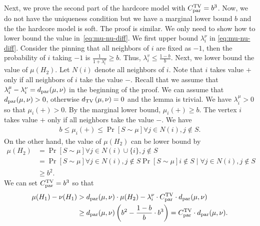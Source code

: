 Next, we prove the second part of the hardcore model with $C^\text{TV}_{\mathrm{par}} = b^3$. Now, we do not have the uniqueness condition but we have a marginal lower bound $b$ and the the hardcore model is soft.
The proof is similar.
We only need to show how to lower bound the value in~\eqref{eq:mu-nu-diff}.
We first upper bound $\lambda^\nu_i$ in \eqref{eq:mu-nu-diff}. Consider the pinning that all neighbors of $i$ are fixed as $-1$, then the probability of $i$ taking $-1$ is $\frac{1}{1+\lambda^\nu_i} \geq b$. Thus, $\lambda_i^v \leq \frac{1-b}{b}$. Next, we lower bound the value of $\mu(H_2)$.
Let $N(i)$ denote all neighbors of $i$.
Note that $i$ takes value $+$ only if all neighbors of $i$ take the value $-$. Recall that we assume that $\lambda_i^\mu-\lambda_i^\nu=d_\mathrm{par}(\mu,\nu)$ in the beginning of the proof. 
We can assume that $d_\mathrm{par}(\mu,\nu) > 0$, otherwise $d_{\mathrm{TV}}\left({\mu},{\nu}\right) = 0$ and the lemma is trivial. 
We have $\lambda^\mu_i > 0$ so that $\mu_i(+) > 0$. 
By the marginal lower bound, $\mu_i(+) \geq b$.
The vertex $i$ takes value $+$ only if all neighbors take the value $-$. We have
\begin{align*}
    b\leq \mu_i(+) \leq \Pr[S\sim \mu]{ \forall j \in N(i), j \notin S}. 
\end{align*}
On the other hand, the value of $\mu(H_2)$ can be lower bound by
\begin{align*}
    \mu(H_2) &= \Pr[S \sim \mu]{\forall j \in N(i) \cup \{i\}, j \notin S}\\
    &= \Pr[S\sim \mu]{ \forall j \in N(i), j \notin S}\Pr[S \sim \mu]{i \notin S \mid \forall j \in N(i), j \notin S}\\
    &\geq b^2.
\end{align*}
We can set $C^\text{TV}_{\mathrm{par}} = b^3$ so that
\begin{align*}
\mu(H_1)-\nu(H_1)&>d_\mathrm{par}(\mu,\nu) \cdot \mu(H_2)-\lambda_i^\nu \cdot C^\text{TV}_{\mathrm{par}} \cdot d_\mathrm{par}(\mu,\nu)\\
&\geq d_\mathrm{par}(\mu,\nu)\left(b^2-\frac{1-b}{b} \cdot b^3\right)=C^\text{TV}_{\mathrm{par}}\cdot d_\mathrm{par}(\mu,\nu).
\end{align*}



